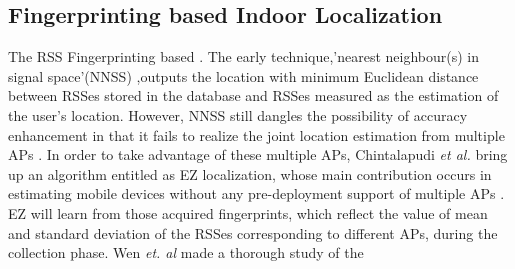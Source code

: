 \documentclass[10pt,conference,compsocconf,letterpaper]{IEEEtran}
\begin{document}
\subsection{Fingerprinting based Indoor Localization}
The RSS Fingerprinting based . The early technique,'nearest neighbour(s) in signal space'(NNSS) \cite{radar},outputs the location with minimum Euclidean distance between RSSes stored in the database and RSSes measured as the estimation of the user’s location. However, NNSS still dangles the possibility of accuracy enhancement in that it fails to realize the joint location estimation from multiple APs \cite{castro01}. In order to take advantage of these multiple APs, Chintalapudi \emph{et al.} bring up an algorithm entitled as EZ localization, whose main contribution occurs in estimating mobile devices without any pre-deployment support of multiple APs \cite{Chintalapudi10}. EZ will learn from those acquired fingerprints, which reflect the value of mean and standard deviation of the RSSes corresponding to different APs, during the collection phase. Wen \emph{et. al} made a thorough study of the 
\end{document}
